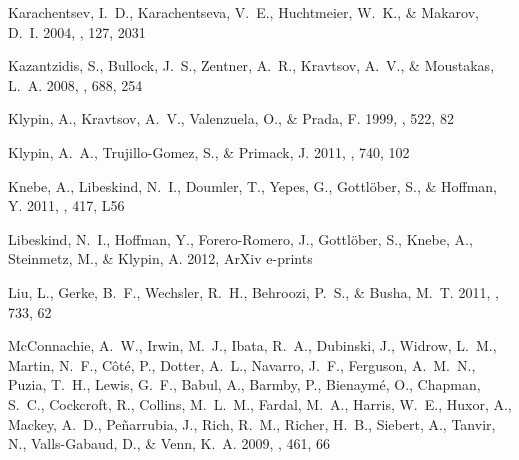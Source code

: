 \documentclass{emulateapj}
\begin{document}
\begin{thebibliography}{25}
{Karachentsev}, I.~D., {Karachentseva}, V.~E., {Huchtmeier}, W.~K., \&
  {Makarov}, D.~I. 2004, \aj, 127, 2031

{Kazantzidis}, S., {Bullock}, J.~S., {Zentner}, A.~R., {Kravtsov}, A.~V., \&
  {Moustakas}, L.~A. 2008, \apj, 688, 254

{Klypin}, A., {Kravtsov}, A.~V., {Valenzuela}, O., \& {Prada}, F. 1999, \apj,
  522, 82

{Klypin}, A.~A., {Trujillo-Gomez}, S., \& {Primack}, J. 2011, \apj, 740, 102

{Knebe}, A., {Libeskind}, N.~I., {Doumler}, T., {Yepes}, G., {Gottl{\"o}ber},
  S., \& {Hoffman}, Y. 2011, \mnras, 417, L56

{Libeskind}, N.~I., {Hoffman}, Y., {Forero-Romero}, J., {Gottl{\"o}ber}, S.,
  {Knebe}, A., {Steinmetz}, M., \& {Klypin}, A. 2012, ArXiv e-prints

{Liu}, L., {Gerke}, B.~F., {Wechsler}, R.~H., {Behroozi}, P.~S., \& {Busha},
  M.~T. 2011, \apj, 733, 62

{McConnachie}, A.~W., {Irwin}, M.~J., {Ibata}, R.~A., {Dubinski}, J., {Widrow},
  L.~M., {Martin}, N.~F., {C{\^o}t{\'e}}, P., {Dotter}, A.~L., {Navarro},
  J.~F., {Ferguson}, A.~M.~N., {Puzia}, T.~H., {Lewis}, G.~F., {Babul}, A.,
  {Barmby}, P., {Bienaym{\'e}}, O., {Chapman}, S.~C., {Cockcroft}, R.,
  {Collins}, M.~L.~M., {Fardal}, M.~A., {Harris}, W.~E., {Huxor}, A., {Mackey},
  A.~D., {Pe{\~n}arrubia}, J., {Rich}, R.~M., {Richer}, H.~B., {Siebert}, A.,
  {Tanvir}, N., {Valls-Gabaud}, D., \& {Venn}, K.~A. 2009, \nat, 461, 66


\end{thebibliography}
\end{document}
